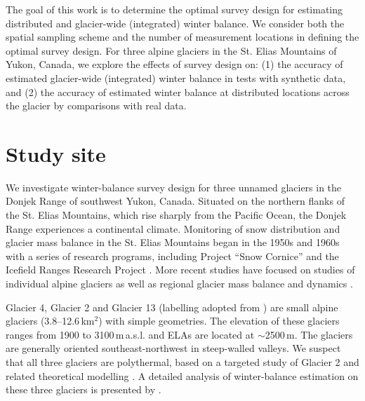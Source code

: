 \documentclass{article}
\begin{document}

The goal of this work is to determine the optimal survey design for estimating distributed and glacier-wide (integrated) winter balance. We consider both the spatial sampling scheme and the number of measurement locations in defining the optimal survey design. For three alpine glaciers in the St. Elias Mountains of Yukon, Canada, we explore the effects of survey design on: 
(1) the accuracy of estimated glacier-wide (integrated) winter balance in tests with synthetic data, and  
(2) the accuracy of estimated winter balance at distributed locations across the glacier by comparisons with real data. 



\section{Study site}

We investigate winter-balance survey design for three unnamed glaciers in the Donjek Range of southwest Yukon, Canada. Situated on the northern flanks of the St. Elias Mountains, which rise sharply from the Pacific Ocean, the Donjek Range experiences a continental climate. Monitoring of snow distribution and glacier mass balance in the St. Elias Mountains began in the 1950s and 1960s with a series of research programs, including Project ``Snow Cornice''  and the Icefield Ranges Research Project \citep{Wood1948, Danby2003}. More recent studies have focused on studies of individual alpine glaciers \citep[e.g.][]{Clarke2014,Flowers2014} as well as regional glacier mass balance and dynamics \citep[e.g.][]{Arendt2008, Burgess2013,Waechter2015}. 

Glacier 4, Glacier 2 and Glacier 13 (labelling adopted from \cite{Crompton2016}) are small alpine glaciers (3.8--12.6\,km$^2$) with simple geometries. The elevation of these glaciers ranges from 1900 to 3100\,m\,a.s.l. and ELAs are located at $\sim$2500\,m. The glaciers are generally oriented southeast-northwest in steep-walled valleys. We suspect that all three glaciers are polythermal, based on a targeted study of Glacier 2 \citep{Wilson2013} and related theoretical modelling \citep{Wilson2013a}. A detailed analysis of winter-balance estimation on these three glaciers is presented by \cite{Pulwicki2017}.
\end{document}
